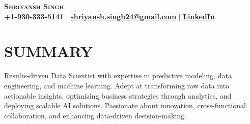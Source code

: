 \documentclass[letterpaper,11pt]{article}
\begin{document}

\begin{center}
    \textbf{\Huge \scshape Shriyansh Singh} \\ \vspace{1pt}
    \small \textbf{+1-930-333-5141}  $|$ \href{mailto:shriyansh.singh24@gmail.com}{\textbf{\underline{shriyansh.singh24@gmail.com}}} $|$ 
    \href{https://www.linkedin.com/in/shriyansh-bir-singh}{\textbf{\underline{LinkedIn}}} 
\end{center}

\section{\textbf{SUMMARY}}
Results-driven Data Scientist with expertise in predictive modeling, data engineering, and machine learning. Adept at transforming raw data into actionable insights, optimizing business strategies through analytics, and deploying scalable AI solutions. Passionate about innovation, cross-functional collaboration, and enhancing data-driven decision-making.

\end{document}
